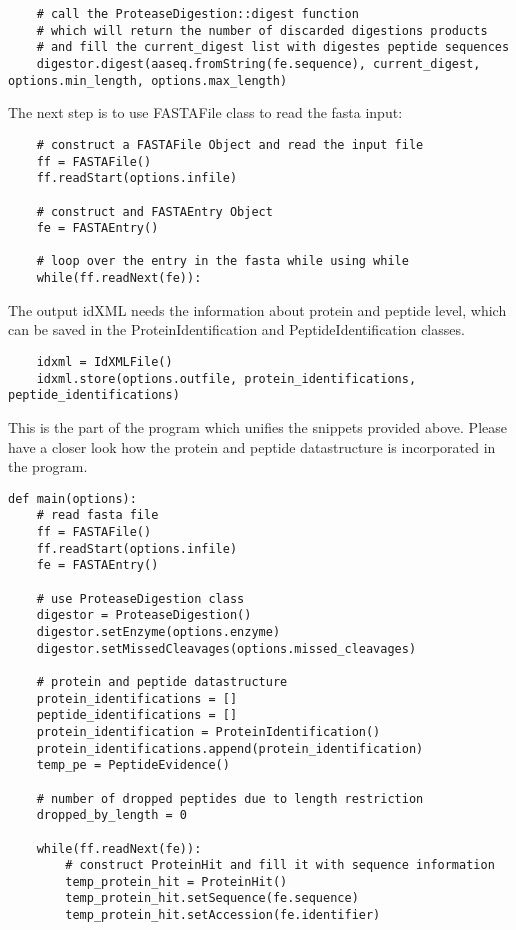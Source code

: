 {\begin{lstlisting}
    # call the ProteaseDigestion::digest function
    # which will return the number of discarded digestions products  
    # and fill the current_digest list with digestes peptide sequences
    digestor.digest(aaseq.fromString(fe.sequence), current_digest, options.min_length, options.max_length)
\end{lstlisting}

\noindent The next step is to use FASTAFile class to read the fasta input:
\begin{lstlisting}
    # construct a FASTAFile Object and read the input file
    ff = FASTAFile()
    ff.readStart(options.infile)
    
    # construct and FASTAEntry Object 
    fe = FASTAEntry()
    
    # loop over the entry in the fasta while using while
    while(ff.readNext(fe)): 
\end{lstlisting}

\noindent The output idXML needs the information about protein and peptide level, which can be saved in the ProteinIdentification and PeptideIdentification classes. 
\begin{lstlisting}
    idxml = IdXMLFile()
    idxml.store(options.outfile, protein_identifications, peptide_identifications)
\end{lstlisting}

\noindent This is the part of the program which unifies the snippets provided above. Please have a closer look how the protein and peptide datastructure is incorporated in the program. 

\begin{lstlisting}
def main(options):
    # read fasta file  
    ff = FASTAFile()
    ff.readStart(options.infile)
    fe = FASTAEntry()

    # use ProteaseDigestion class 
    digestor = ProteaseDigestion()
    digestor.setEnzyme(options.enzyme)
    digestor.setMissedCleavages(options.missed_cleavages)

    # protein and peptide datastructure
    protein_identifications = []
    peptide_identifications = []
    protein_identification = ProteinIdentification()
    protein_identifications.append(protein_identification)
    temp_pe = PeptideEvidence()

    # number of dropped peptides due to length restriction
    dropped_by_length = 0

    while(ff.readNext(fe)):  
        # construct ProteinHit and fill it with sequence information
        temp_protein_hit = ProteinHit()
        temp_protein_hit.setSequence(fe.sequence)
        temp_protein_hit.setAccession(fe.identifier)


\end{lstlisting}}

